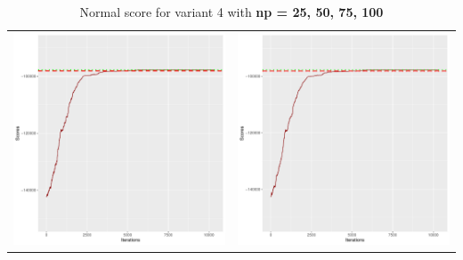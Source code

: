 \documentclass[]{scrartcl}
\begin{document}
\begin{table}[h!]
\begin{tabular}{cc}
\includegraphics[scale = 0.4]{./figs/hepar2/v4/75/boundsEvolution-10352.pdf} & 
\includegraphics[scale = 0.4]{./figs/hepar2/v4/100/boundsEvolution-10352.pdf} \\
\end{tabular}
\caption{Normal score for variant 4 with \textbf{np =  25, 50, 75, 100}}
\end{table}
\end{document}
